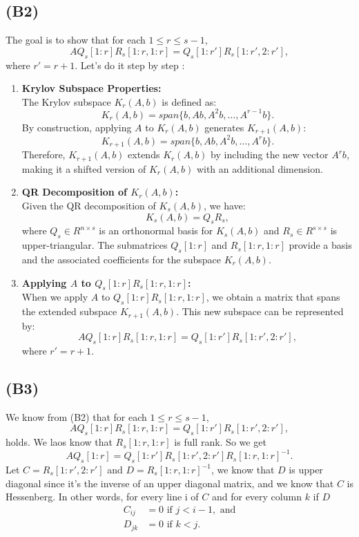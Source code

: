 \documentclass{article}
\begin{document}
\subsection*{(B2)}
The goal is to show that for each $ 1 \leq r \leq s - 1 $,
\[
A Q_s[1:r] R_s[1:r, 1:r] = Q_s[1:r'] R_s[1:r', 2:r'],
\]
where $ r' = r + 1 $.
Let's do it step by step : 
\begin{enumerate}
    \item \textbf{Krylov Subspace Properties:} \\
    The Krylov subspace $ K_r(A, b) $ is defined as:
    \[
    K_r(A, b) = span\{b, Ab, A^2b, \dots, A^{r-1}b\}.
    \]
    By construction, applying $ A $ to $ K_r(A, b) $ generates $ K_{r+1}(A, b) $:
    \[
    K_{r+1}(A, b) = span\{b, Ab, A^2b, \dots, A^r b\}.
    \]
    Therefore, $ K_{r+1}(A, b) $ extends $ K_r(A, b) $ by including the new vector $ A^r b $, making it a shifted version of $ K_r(A, b) $ with an additional dimension.

    \item \textbf{QR Decomposition of $ K_r(A, b) $:} \\
    Given the QR decomposition of $ K_s(A, b) $, we have:
    \[
    K_s(A, b) = Q_s R_s,
    \]
    where $ Q_s \in R^{n \times s} $ is an orthonormal basis for $ K_s(A, b) $ and $ R_s \in R^{s \times s} $ is upper-triangular. The submatrices $ Q_s[1:r] $ and $ R_s[1:r, 1:r] $ provide a basis and the associated coefficients for the subspace $ K_r(A, b) $.

    \item \textbf{Applying $ A $ to $ Q_s[1:r] R_s[1:r, 1:r] $:} \\
    When we apply $ A $ to $ Q_s[1:r] R_s[1:r, 1:r] $, we obtain a matrix that spans the extended subspace $ K_{r+1}(A, b) $. This new subspace can be represented by:
    \[
    A Q_s[1:r] R_s[1:r, 1:r] = Q_s[1:r'] R_s[1:r', 2:r'],
    \]
    where $ r' = r + 1 $. 
\end{enumerate}


\subsection*{(B3)}
We know from (B2) that for each $1 \leq r \leq s-1$, 
\[
A Q_s[1:r] R_s[1:r, 1:r] = Q_s[1:r'] R_s[1:r', 2:r'],
\]
holds. We laos know that $R_s[1:r, 1:r]$ is full rank. So we get 
\[
A Q_s[1:r]  = Q_s[1:r'] R_s[1:r', 2:r']R_s[1:r, 1:r]^{-1}.
\]
Let $C=R_s[1:r', 2:r']$ and $D=R_s[1:r, 1:r]^{-1}$, we know that $D$ is upper diagonal since it's the inverse of an upper diagonal matrix, and we know that $C$ is Hessenberg. In other words, for every line i of $C$ and for every column $k$ if $D$
\begin{align*}
    C_{ij} &= 0 \text{ if } j < i-1, \text{ and} \\
    D_{jk} &= 0 \text{ if } k < j.
\end{align*}
\end{document}
